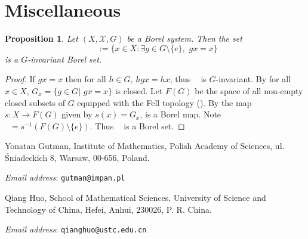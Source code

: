 \documentclass[11pt]{article}
\theoremstyle{plain}
\newtheorem{prop}[thm]{Proposition}
\theoremstyle{definition}
\DeclareMathOperator{\Xnf}{X_{nf}}
\numberwithin{figure}{section}
\begin{document}
\section{Miscellaneous}
\begin{prop}\label{prop:X_nf is Borel}
    Let $(X,\mathcal{X},G)$ be a Borel system. Then the set 
    $$\Xnf:=\{x\in X: \exists g\in G\setminus\{e\},\, \, gx=x\}$$ 
    is a $G$-invariant Borel set. 
    
    
    
  
\end{prop}

\begin{proof}
    If $gx=x$ then for all $h\in G$, $hgx=hx$, thus $\Xnf$ is $G$-invariant. By 
    \cite[Theorem 2.3.2]{BK96} for all $x\in X$, $G_x=\{g\in G|\,\, gx=x\}$ is closed. Let $F(G)$ be the space of all non-empty closed subsets of $G$ equipped with the Fell topology (\cite{fell1962hausdorff}). By \cite[Proposition II.2.3]{auslander1966unitary} the map $s:X\rightarrow F(G)$ given by $s(x)=G_x$, is a Borel map. Note  $\Xnf=s^{-1}(F(G)\setminus\{e\})$. Thus $\Xnf$ is a Borel set.  
\end{proof}




\noindent Yonatan Gutman, Institute of Mathematics, Polish Academy of Sciences, ul. \'{S}niadeckich 8, Warsaw, 00-656, Poland.

\noindent\textit{Email address}: \texttt{gutman@impan.pl}

\noindent Qiang Huo, School of Mathematical Sciences, University of Science and Technology of China, Hefei, Anhui, 230026, P. R. China.

\noindent\textit{Email address}: \texttt{qianghuo@ustc.edu.cn}
\end{document}
